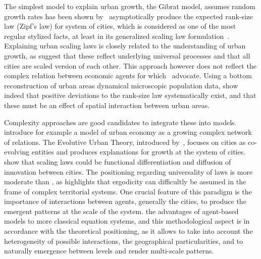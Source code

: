 \documentclass[Royal,sageh,times]{sagej}
\begin{document}
The simplest model to explain urban growth, the Gibrat model, assumes random growth rates  has been shown by~\cite{gabaix1999zipf}  asymptotically produce the expected rank-size law (Zipf's law) for system of cities, which is considered as one of the most regular stylized facts, at least in its generalized scaling law formulation~\citep{nitsch2005zipf}. Explaining urban scaling laws is closely related to the understanding of urban growth, as \cite{bettencourt2008large} suggest that these reflect underlying universal processes and that all cities are scaled version of each other. This approach however does not reflect the complex relation between economic agents for which~\cite{storper2009rethinking} advocate. Using a bottom reconstruction of urban areas  dynamical microscopic population data, \cite{rozenfeld2008laws} show indeed that positive deviations to the rank-size law systematically exist, and that these must be an effect of spatial interaction between urban areas. 

Complexity approaches are good candidates to integrate these  into models. \cite{andersson2006complex} introduce for example a model of urban economy as a growing complex network of relations. The Evolutive Urban Theory, introduced by~\cite{pumain1997pour}, focuses on cities as co-evolving entities and produces explanations for growth at the  system of cities. \cite{pumain2006evolutionary} show that scaling laws could be  functional differentiation and  diffusion of innovation between cities. The positioning regarding universality of laws is more moderate than , as \cite{pumain2012urban} highlights that ergodicity can difficultly be assumed in the frame of complex territorial systems. One crucial feature of this paradigm is the importance of interactions between agents, generally the cities, to produce the emergent patterns at the scale of the system. \cite{pumain2013theoretical}  the advantages of agent-based models  to more classical equation systems, and this methodological aspect is in accordance with the theoretical positioning, as it allows to take into account the heterogeneity of possible interactions, the geographical particularities, and to naturally  emergence between levels and render multi-scale patterns.
\end{document}

